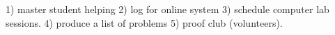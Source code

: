 1) master student helping
2) log for online system
3) schedule computer lab sessions.
4) produce a list of problems
5) proof club (volunteers).

